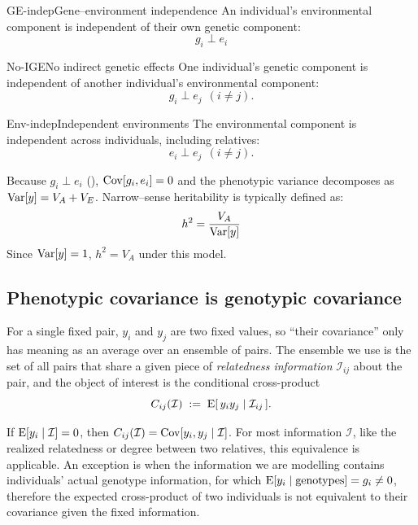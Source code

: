 \documentclass[12pt]{article}
\begin{document}
\begin{assumption}{GE-indep}{Gene--environment independence}
An individual's environmental component is independent of their own genetic component:
$$ g_i \perp e_i $$
\end{assumption}

\begin{assumption}{No-IGE}{No indirect genetic effects}
One individual's genetic component is independent of another individual's environmental component:
$$ g_i \perp e_j \ \ (i \neq j) . $$
\end{assumption}

\begin{assumption}{Env-indep}{Independent environments}
The environmental component is independent across individuals, including relatives:
$$  e_i \perp e_j \ \ (i \neq j). $$
\end{assumption}

Because $g_i\perp e_i$ (), $\mathrm{Cov}[g_i,e_i]=0$ and the phenotypic variance decomposes as $\mathrm{Var}[y]=V_A+V_E$.
Narrow--sense heritability is typically defined as:
$$ h^2 = \frac{V_A}{\mathrm{Var}[y]}$$
Since $\mathrm{Var}[y] = 1$, $h^2 = V_A$ under this model.


\subsection{Phenotypic covariance is genotypic covariance}
For a single fixed pair, $y_i$ and $y_j$ are two fixed values, so ``their covariance'' only has meaning as an average over an ensemble of pairs.
The ensemble we use is the set of all pairs that share a given piece of \emph{relatedness information} $\mathcal{I}_{ij}$ about the pair, and the object of interest is the conditional cross-product
\begin{equation}\label{eq:object}
    C_{ij}(\mathcal{I}) \;:=\; \mathrm{E}[\, y_i y_j \mid \mathcal{I}_{ij}\,] .
\end{equation}

If $\mathrm{E}[y_i \mid \mathcal{I}]=0$, then $C_{ij}(\mathcal{I}) = \mathrm{Cov}[y_i,y_j\mid \mathcal{I}]$.
For most information $\mathcal{I}$, like the realized relatedness or degree between two relatives, this equivalence is applicable.
An exception is when the information we are modelling contains individuals' actual genotype information, for which $\mathrm{E}[y_i\mid \text{genotypes}]=g_i\neq 0$, therefore the expected cross-product of two individuals is not equivalent to their covariance given the fixed information.
\end{document}
